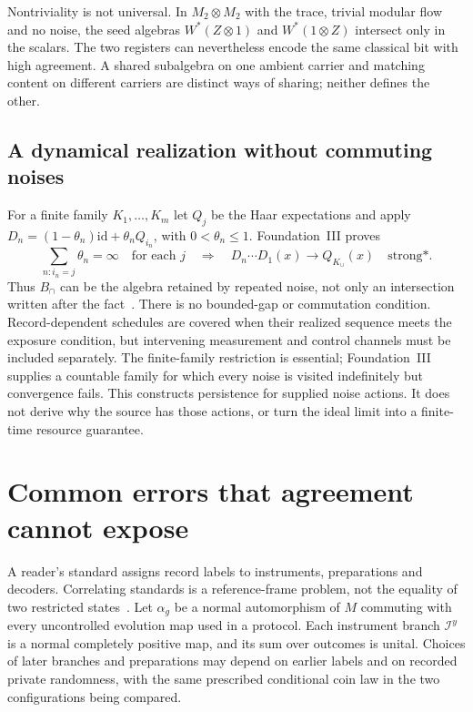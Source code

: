 \documentclass[12pt]{article}
\theoremstyle{definition}
\theoremstyle{remark}
\begin{document}
Nontriviality is not universal. In $M_2\otimes M_2$ with the trace, trivial
modular flow and no noise, the seed algebras $W^*(Z\otimes1)$ and
$W^*(1\otimes Z)$ intersect only in the scalars. The two registers can nevertheless
encode the same classical bit with high agreement. A shared subalgebra on one
ambient carrier and matching content on different carriers are distinct ways
of sharing; neither defines the other.

\subsection{A dynamical realization without commuting noises}

For a finite family $K_1,\ldots,K_m$ let $Q_j$ be the Haar expectations and apply
$D_n=(1-\theta_n)\mathrm{id}+\theta_nQ_{i_n}$, with $0<\theta_n\le1$.
Foundation~III proves
\begin{equation}\label{eq:shareddynamics}
 \sum_{n:i_n=j}\theta_n=\infty\quad\text{for each }j
 \quad\Longrightarrow\quad
 D_n\cdots D_1(x)\longrightarrow Q_{K_\cup}(x)\quad\text{strong*}.
\end{equation}
Thus $B_\cap$ can be the algebra retained by repeated noise, not only an
intersection written after the fact~\cite{FoundationIII}.
There is no bounded-gap or commutation condition. Record-dependent schedules
are covered when their realized sequence meets the exposure condition, but
intervening measurement and control channels must be included separately.
The finite-family restriction is essential; Foundation~III supplies a countable
family for which every noise is visited indefinitely but convergence fails.
This constructs persistence for supplied noise actions. It does not derive why
the source has those actions, or turn the ideal limit into a finite-time
resource guarantee.

\section{Common errors that agreement cannot expose}\label{sec:commonerror}

A reader's standard assigns record labels to instruments, preparations and
decoders. Correlating standards is a reference-frame problem, not the equality
of two restricted states~\cite{BRS2007}. Let $\alpha_g$ be a normal automorphism
of $M$ commuting with every uncontrolled evolution map used in a protocol.
Each instrument branch $\mathcal I^y$ is a normal completely positive map,
and its sum over outcomes is unital. Choices of later branches and preparations
may depend on earlier labels and on recorded private randomness, with the same
prescribed conditional coin law in the two configurations being compared.
\end{document}
